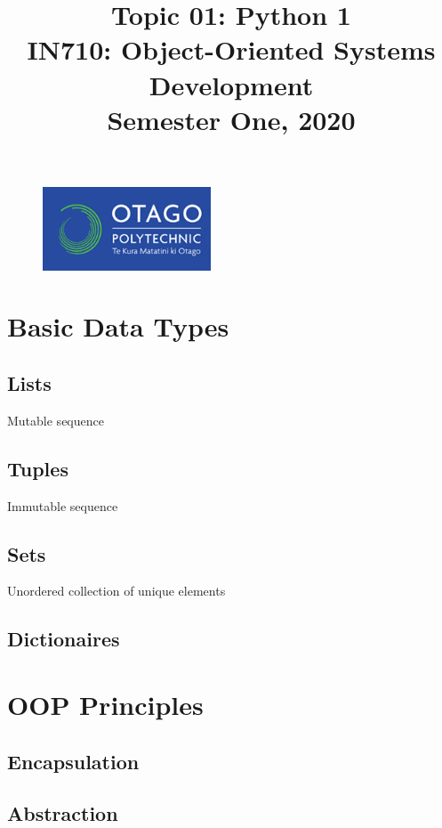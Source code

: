 \documentclass{article}
\author{}
\begin{document}
\begin{figure}
  \includegraphics[width=50mm]{../../../resources/img/logo.png}
\end{figure}

\title{Topic 01: Python 1\\IN710: Object-Oriented Systems Development\\Semester One, 2020}
\date{}
\maketitle

\section*{Basic Data Types}

\subsection*{Lists}
Mutable sequence

\subsection*{Tuples}
Immutable sequence

\subsection*{Sets}
Unordered collection of unique elements

\subsection*{Dictionaires}

\section*{OOP Principles}

\subsection*{Encapsulation}

\subsection*{Abstraction}
\end{document}
